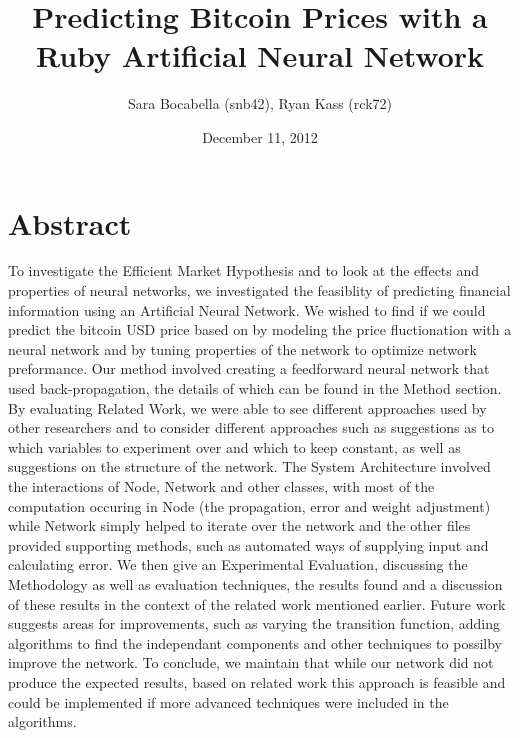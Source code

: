 \documentclass[a4paper,11pt]{article}
\title{Predicting Bitcoin Prices with a Ruby Artificial Neural Network}
\author{Sara Bocabella (snb42), Ryan Kass (rck72)}
\date{December 11, 2012}
\begin{document}
\maketitle
\section{Abstract}
To investigate the Efficient Market Hypothesis and to look at the effects and properties of neural networks, we investigated the feasiblity of predicting financial information using an Artificial Neural Network. We wished to find if we could predict the bitcoin USD price based on by modeling the price fluctionation with a neural network and by tuning properties of the network to optimize network preformance.  Our method involved creating a feedforward neural network that used back-propagation, the details of which can be found in the Method section. By evaluating Related Work, we were able to see different approaches used by other researchers  and to consider different approaches such as suggestions as to which variables to experiment over and which to keep constant, as well as suggestions  on the structure of the network. The System Architecture involved the interactions of Node, Network and other classes, with most of the computation occuring in Node (the propagation, error and weight adjustment) while 
Network simply helped to iterate over the network and the other files provided supporting methods, such as automated ways of supplying input and calculating error. We then give an Experimental Evaluation, discussing the Methodology as well as evaluation techniques, the results found and a discussion of these results in the context of the related work mentioned earlier. Future work suggests areas for improvements, such as varying the transition function, adding algorithms to find the independant components and other techniques to possilby improve the network. To conclude, we maintain that while our network did not produce the expected results, based on related work this approach is feasible and could be implemented if more advanced techniques were included in the algorithms. 
\end{document}
